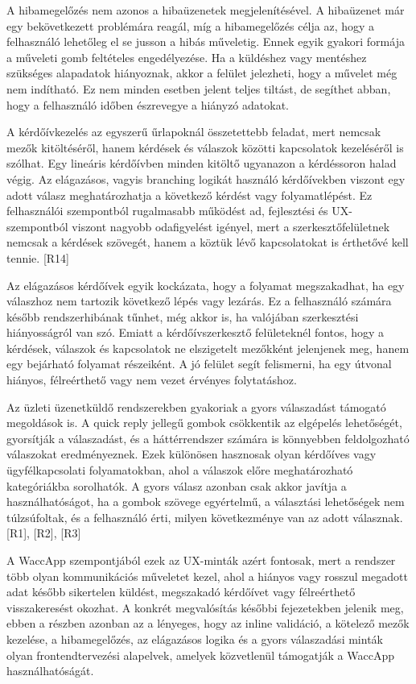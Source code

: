 A hibamegelőzés nem azonos a hibaüzenetek megjelenítésével. A hibaüzenet már egy bekövetkezett problémára reagál, míg a hibamegelőzés célja az, hogy a felhasználó lehetőleg el se jusson a hibás műveletig. Ennek egyik gyakori formája a műveleti gomb feltételes engedélyezése. Ha a küldéshez vagy mentéshez szükséges alapadatok hiányoznak, akkor a felület jelezheti, hogy a művelet még nem indítható. Ez nem minden esetben jelent teljes tiltást, de segíthet abban, hogy a felhasználó időben észrevegye a hiányzó adatokat.

A kérdőívkezelés az egyszerű űrlapoknál összetettebb feladat, mert nemcsak mezők kitöltéséről, hanem kérdések és válaszok közötti kapcsolatok kezeléséről is szólhat. Egy lineáris kérdőívben minden kitöltő ugyanazon a kérdéssoron halad végig. Az elágazásos, vagyis branching logikát használó kérdőívekben viszont egy adott válasz meghatározhatja a következő kérdést vagy folyamatlépést. Ez felhasználói szempontból rugalmasabb működést ad, fejlesztési és UX-szempontból viszont nagyobb odafigyelést igényel, mert a szerkesztőfelületnek nemcsak a kérdések szövegét, hanem a köztük lévő kapcsolatokat is érthetővé kell tennie. [R14]

Az elágazásos kérdőívek egyik kockázata, hogy a folyamat megszakadhat, ha egy válaszhoz nem tartozik következő lépés vagy lezárás. Ez a felhasználó számára később rendszerhibának tűnhet, még akkor is, ha valójában szerkesztési hiányosságról van szó. Emiatt a kérdőívszerkesztő felületeknél fontos, hogy a kérdések, válaszok és kapcsolatok ne elszigetelt mezőkként jelenjenek meg, hanem egy bejárható folyamat részeiként. A jó felület segít felismerni, ha egy útvonal hiányos, félreérthető vagy nem vezet érvényes folytatáshoz.

Az üzleti üzenetküldő rendszerekben gyakoriak a gyors válaszadást támogató megoldások is. A quick reply jellegű gombok csökkentik az elgépelés lehetőségét, gyorsítják a válaszadást, és a háttérrendszer számára is könnyebben feldolgozható válaszokat eredményeznek. Ezek különösen hasznosak olyan kérdőíves vagy ügyfélkapcsolati folyamatokban, ahol a válaszok előre meghatározható kategóriákba sorolhatók. A gyors válasz azonban csak akkor javítja a használhatóságot, ha a gombok szövege egyértelmű, a választási lehetőségek nem túlzsúfoltak, és a felhasználó érti, milyen következménye van az adott válasznak. [R1], [R2], [R3]

A WaccApp szempontjából ezek az UX-minták azért fontosak, mert a rendszer több olyan kommunikációs műveletet kezel, ahol a hiányos vagy rosszul megadott adat később sikertelen küldést, megszakadó kérdőívet vagy félreérthető visszakeresést okozhat. A konkrét megvalósítás későbbi fejezetekben jelenik meg, ebben a részben azonban az a lényeges, hogy az inline validáció, a kötelező mezők kezelése, a hibamegelőzés, az elágazásos logika és a gyors válaszadási minták olyan frontendtervezési alapelvek, amelyek közvetlenül támogatják a WaccApp használhatóságát.

